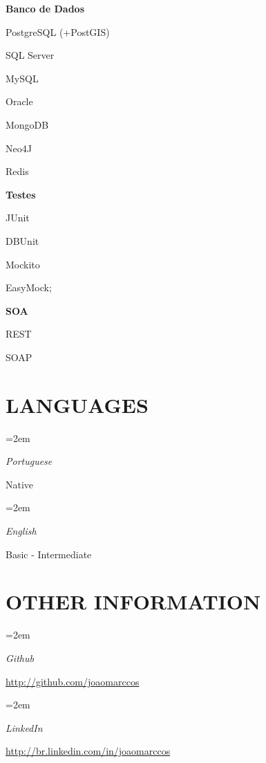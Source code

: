 \documentclass[paper=a4,fontsize=14pt]{article}
\let\olditemize\itemize
\let\endolditemize\enditemize
\renewenvironment{itemize}{%
    \small
    \olditemize
}{%
    \endolditemize
}
\newlength{\spacebox}
\newcommand{\NewPart}[1]{ \section*{\large \uppercase{#1}}}
\newcommand{\PersonalEntry}[2]{
		\noindent\hangindent=2em\hangafter=0 		%
		\parbox{\spacebox}{				%
		\textit{#1}}					%
		\hspace{1.5em} #2 \par}				%
\newcommand{\SkillsEntry}[2]{					%
		\noindent\hangindent=2em\hangafter=0 		%
		\parbox{\spacebox}{				%
		\textit{#1}}					%
		\hspace{1.5em} #2 \par}				%
\begin{document}
\begin{multicols}{3}[]

\columnbreak
\begin{itemize}[nolistsep]
	\item[] \hspace{-0.5cm} \textbf{Banco de Dados}
    \item PostgreSQL (+PostGIS)
    \item SQL Server
    \item MySQL 
    \item Oracle
    \item MongoDB 
    \item Neo4J 
    \item Redis
\end{itemize}

\columnbreak
\begin{itemize}[nolistsep]
	\item[] \hspace{-0.5cm} \textbf{Testes}
    \item JUnit
    \item DBUnit 
    \item Mockito 
    \item EasyMock; 
\end{itemize}

\columnbreak
\begin{itemize}[nolistsep]
	\item[] \hspace{-0.5cm} \textbf{SOA}
    \item REST
    \item SOAP
\end{itemize}
\end{multicols}

\NewPart{Languages}{}
\SkillsEntry{Portuguese}{Native}
\SkillsEntry{English}{Basic - Intermediate}

\NewPart{Other information}{}
\SkillsEntry{Github}{\url{http://github.com/joaomarccos}}
\SkillsEntry{LinkedIn}{\url{http://br.linkedin.com/in/joaomarccos}}
\end{document}
